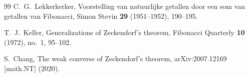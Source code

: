 \documentclass[12pt,a4paper]{article}
\begin{document}
\begin{thebibliography}{99}
C.~G.~Lekkerkerker,
Voorstelling van natuurlijke getallen door een som van getallen van Fibonacci,
Simon Stevin \textbf{29} (1951--1952), 190--195.

T.~J.~Keller,
Generalizations of Zeckendorf's theorem,
Fibonacci Quarterly \textbf{10} (1972), no.~1, 95--102.

S.~Chang,
The weak converse of Zeckendorf's theorem,
arXiv:2007.12169 [math.NT] (2020).

\end{thebibliography}
\end{document}
